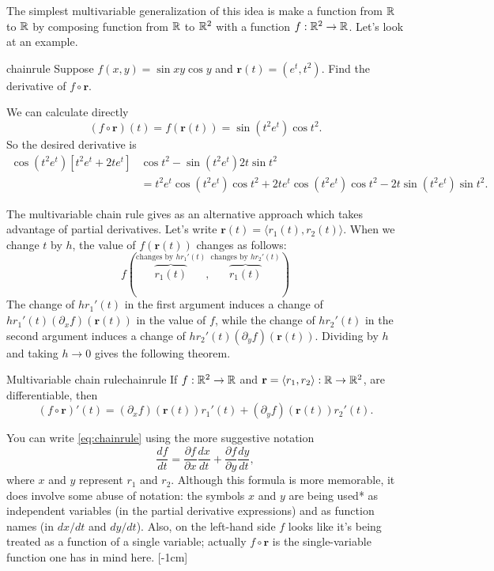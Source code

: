 \documentclass[svgnames]{watsonbook}
\begin{document}
  The simplest multivariable generalization of this idea is make a
  function from $\mathbb{R}$ to $\mathbb{R}$ by composing function from $\mathbb{R}$ to $\mathbb{R}^2$
  with a function $f: \mathbb{R}^2 \to \mathbb{R}$. Let's look at an example.

  \begin{example}{}{chainrule}
    Suppose $f(x,y) = \sin xy \cos y$ and $\mathbf{r}(t) = (e^t,
    t^2)$. Find the derivative of $f \circ \mathbf{r}$. 
  \end{example}

  \begin{solution}
    We can calculate directly
    \[
      (f \circ \mathbf{r})(t) = f(\mathbf{r}(t)) = \sin (t^2e^t) \cos
      t^2. 
    \]
    So the desired derivative is
    \begin{align*}
      \cos(t^2e^t)\left[ t^2 e^t + 2te^t\right] &\cos t^2  -
      \sin(t^2 e^t) 2t \sin t^2  \\ &=
      t^2 e^t \cos(t^2 e^t) \cos t^2 + 2te^t \cos(t^2 e^t) \cos t^2 -
      2t\sin(t^2 e^t) \sin t^2. 
    \end{align*}
  \end{solution}

  The multivariable chain rule gives as an alternative approach which
  takes advantage of partial derivatives. Let's write
  $\mathbf{r}(t) = \langle r_1(t), r_2(t) \rangle$.  When we change
  $t$ by $h$, the value of $f(\mathbf{r}(t))$ changes as follows: 
  \[
    f\left(
      \overbrace{r_1(t)}^{\text{changes by $hr_1'(t)$}},
      \overbrace{r_1(t)}^{\text{changes by $hr_2'(t)$}}
    \right)
  \]
  The change of $hr_1'(t)$ in the first argument induces a change of
  $hr_1'(t) (\partial_xf)(\mathbf{r}(t))$ in the value of $f$, while
  the change of $hr_2'(t)$ in the second argument induces a change of
  $hr_2'(t) (\partial_yf)(\mathbf{r}(t))$. Dividing by $h$ and taking
  $h \to 0$ gives the following theorem. 
  
  \begin{theo}{Multivariable chain rule}{chainrule}
    If $f : \mathbb{R}^2 \to \mathbb{R}$ and $\mathbf{r} = \langle r_1,  r_2\rangle :
    \mathbb{R} \to \mathbb{R}^2$,
    are differentiable, then
    \begin{equation} \label{eq:chainrule} 
      (f\circ \mathbf{r})'(t) = (\partial_x f)(\mathbf{r}(t))r_1'(t) +
      (\partial_y f)(\mathbf{r}(t))r_2'(t). 
    \end{equation}
  \end{theo}

  You can write \eqref{eq:chainrule} using the more suggestive
  notation
  \[
    \frac{df}{dt} = \frac{\partial f}{\partial x}\frac{dx}{dt} +
    \frac{\partial f}{\partial y}\frac{dy}{dt}, 
  \]
  where $x$ and $y$ represent $r_1$ and $r_2$. Although this formula
  is more memorable, it does involve some abuse of notation: the
  symbols $x$ and $y$ are being used* as independent variables (in the
  partial derivative expressions) and as function names (in $dx/dt$
  and $dy/dt$). Also, on the left-hand side $f$ looks like it's being
  treated as a function of a single variable; actually
  $f\circ \mathbf{r}$ is the single-variable function one has in mind here.
  [-1cm]
\end{document}
